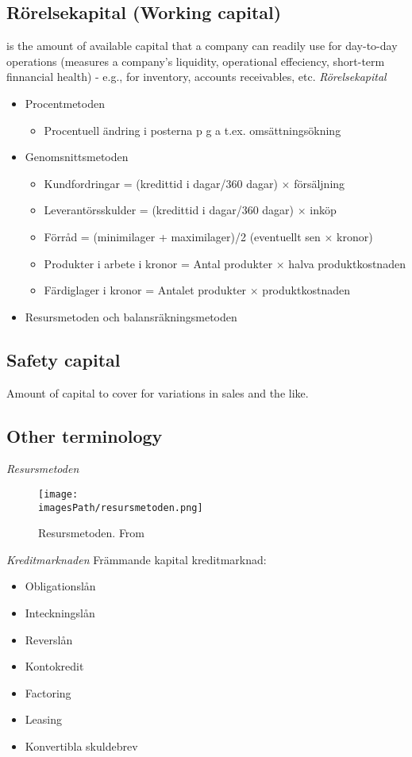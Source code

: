 \subsection{Rörelsekapital (Working capital)}
is the amount of available capital that a company can readily use for 
day-to-day operations (measures a company's liquidity, operational effeciency,
short-term finnancial health) - e.g., for inventory, accounts receivables, etc.
\textit{Rörelsekapital}
\begin{itemize}
    \item Procentmetoden
    \begin{itemize}
        \item Procentuell ändring i posterna p g a t.ex. omsättningsökning
    \end{itemize}
    \item Genomsnittsmetoden
    \begin{itemize}
        \item Kundfordringar = (kredittid i dagar/360 dagar) $\times$ försäljning
        \item Leverantörsskulder = (kredittid i dagar/360 dagar) $\times$ inköp
        \item Förråd = (minimilager + maximilager)/2 (eventuellt sen $\times$ kronor)
        \item Produkter i arbete i kronor = Antal produkter $\times$ halva produktkostnaden
        \item Färdiglager i kronor = Antalet produkter $\times$ produktkostnaden
    \end{itemize}
    \item Resursmetoden och balansräkningsmetoden 
\end{itemize}

\subsection{Safety capital}
Amount of capital to cover for variations in sales and the like.

\subsection{Other terminology}
\textit{Resursmetoden}
\begin{figure}[!ht]
    \centering
    \texttt{[image: \\imagesPath/resursmetoden.png]}
    \caption{Resursmetoden. From \cite{}}
\end{figure}

\textit{Kreditmarknaden} \newline
Främmande kapital kreditmarknad:
\begin{itemize}
    \item Obligationslån
    \item Inteckningslån 
    \item Reverslån 
    \item Kontokredit 
    \item Factoring
    \item Leasing 
    \item Konvertibla skuldebrev
\end{itemize}

